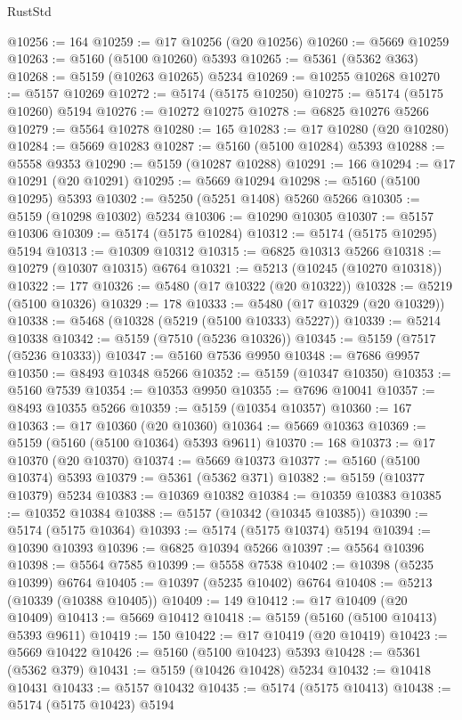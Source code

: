 \begin{lexlean}{RustStd}
\begin{coremodule}
@10256 := 164
@10259 := @17 @10256 (@20 @10256)
@10260 := @5669 @10259
@10263 := @5160 (@5100 @10260) @5393
@10265 := @5361 (@5362 @363)
@10268 := @5159 (@10263 @10265) @5234
@10269 := @10255 @10268
@10270 := @5157 @10269
@10272 := @5174 (@5175 @10250)
@10275 := @5174 (@5175 @10260) @5194
@10276 := @10272 @10275
@10278 := @6825 @10276 @5266
@10279 := @5564 @10278
@10280 := 165
@10283 := @17 @10280 (@20 @10280)
@10284 := @5669 @10283
@10287 := @5160 (@5100 @10284) @5393
@10288 := @5558 @9353
@10290 := @5159 (@10287 @10288)
@10291 := 166
@10294 := @17 @10291 (@20 @10291)
@10295 := @5669 @10294
@10298 := @5160 (@5100 @10295) @5393
@10302 := @5250 (@5251 @1408) @5260 @5266
@10305 := @5159 (@10298 @10302) @5234
@10306 := @10290 @10305
@10307 := @5157 @10306
@10309 := @5174 (@5175 @10284)
@10312 := @5174 (@5175 @10295) @5194
@10313 := @10309 @10312
@10315 := @6825 @10313 @5266
@10318 := @10279 (@10307 @10315) @6764
@10321 := @5213 (@10245 (@10270 @10318))
@10322 := 177
@10326 := @5480 (@17 @10322 (@20 @10322))
@10328 := @5219 (@5100 @10326)
@10329 := 178
@10333 := @5480 (@17 @10329 (@20 @10329))
@10338 := @5468 (@10328 (@5219 (@5100 @10333) @5227))
@10339 := @5214 @10338
@10342 := @5159 (@7510 (@5236 @10326))
@10345 := @5159 (@7517 (@5236 @10333))
@10347 := @5160 @7536 @9950
@10348 := @7686 @9957
@10350 := @8493 @10348 @5266
@10352 := @5159 (@10347 @10350)
@10353 := @5160 @7539
@10354 := @10353 @9950
@10355 := @7696 @10041
@10357 := @8493 @10355 @5266
@10359 := @5159 (@10354 @10357)
@10360 := 167
@10363 := @17 @10360 (@20 @10360)
@10364 := @5669 @10363
@10369 := @5159 (@5160 (@5100 @10364) @5393 @9611)
@10370 := 168
@10373 := @17 @10370 (@20 @10370)
@10374 := @5669 @10373
@10377 := @5160 (@5100 @10374) @5393
@10379 := @5361 (@5362 @371)
@10382 := @5159 (@10377 @10379) @5234
@10383 := @10369 @10382
@10384 := @10359 @10383
@10385 := @10352 @10384
@10388 := @5157 (@10342 (@10345 @10385))
@10390 := @5174 (@5175 @10364)
@10393 := @5174 (@5175 @10374) @5194
@10394 := @10390 @10393
@10396 := @6825 @10394 @5266
@10397 := @5564 @10396
@10398 := @5564 @7585
@10399 := @5558 @7538
@10402 := @10398 (@5235 @10399) @6764
@10405 := @10397 (@5235 @10402) @6764
@10408 := @5213 (@10339 (@10388 @10405))
@10409 := 149
@10412 := @17 @10409 (@20 @10409)
@10413 := @5669 @10412
@10418 := @5159 (@5160 (@5100 @10413) @5393 @9611)
@10419 := 150
@10422 := @17 @10419 (@20 @10419)
@10423 := @5669 @10422
@10426 := @5160 (@5100 @10423) @5393
@10428 := @5361 (@5362 @379)
@10431 := @5159 (@10426 @10428) @5234
@10432 := @10418 @10431
@10433 := @5157 @10432
@10435 := @5174 (@5175 @10413)
@10438 := @5174 (@5175 @10423) @5194

\end{coremodule}
\end{lexlean}
